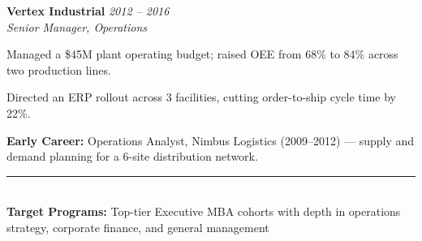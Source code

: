 \documentclass[10pt]{article}
\newcommand{\role}[3]{%
  \noindent\textbf{\color{navy}#1} \hfill {\small\color{slate}\textit{#3}}\\
  \textit{\color{slate}#2}\par\vspace{2pt}%
}
\begin{document}
\begin{minipage}[t]{0.655\textwidth}
\vspace{9pt}
\role{Vertex Industrial}{Senior Manager, Operations}{2012 -- 2016}
\begin{cvitems}
\item Managed a \$45M plant operating budget; raised OEE from 68\% to 84\% across two production lines.
\item Directed an ERP rollout across 3 facilities, cutting order-to-ship cycle time by 22\%.
\end{cvitems}

\vspace{9pt}
{\small\textbf{\color{navy}Early Career:} Operations Analyst, Nimbus Logistics (2009--2012) --- supply and demand planning for a 6-site distribution network.}

\end{minipage}

\vspace{2pt}

\begin{center}
{\color{gold}\rule{0.4\textwidth}{0.6pt}}\\[3pt]
{\footnotesize\color{slate}\textbf{\color{navy}Target Programs:} Top-tier Executive MBA cohorts with depth in operations strategy, corporate finance, and general management}
\end{center}
\end{document}
